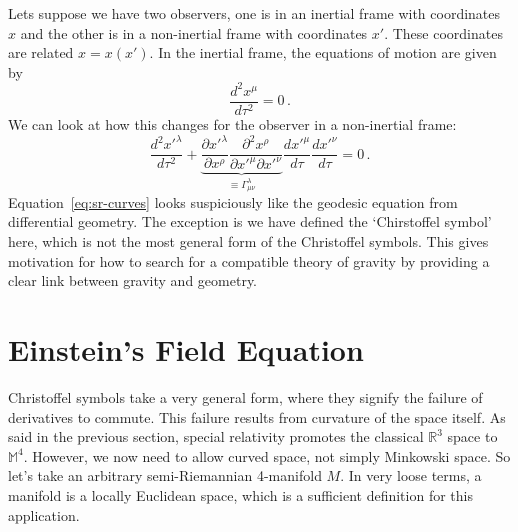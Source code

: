 Lets suppose we have two observers, one is in an inertial frame with coordinates $x$ and the other is in a non-inertial frame with coordinates $x'$. These coordinates are related $x = x(x')$. In the inertial frame, the equations of motion are given by 
\begin{equation}
    \frac{d^2x^\mu}{d\tau^2} = 0\,.
\end{equation} 
We can look at how this changes for the observer in a non-inertial frame:
\begin{equation}\label{eq:sr-curves}
    \frac{d^2x'^\lambda}{d\tau^2}+\underbrace{\frac{\partial x'^\lambda}{\partial x^\rho}\frac{\partial^2 x^\rho}{\partial x'^\mu \partial x'^\nu}}_{\equiv \Gamma_{\mu\nu}^\lambda} \frac{d x'^\mu}{d \tau} \frac{d x'^\nu}{d \tau} = 0\,.
\end{equation}
Equation~\ref{eq:sr-curves} looks suspiciously like the geodesic equation from differential geometry. The exception is we have defined the `Chirstoffel symbol' here, which is not the most general form of the Christoffel symbols. This gives motivation for how to search for a compatible theory of gravity by providing a clear link between gravity and geometry. 
\section{Einstein's Field Equation}
Christoffel symbols take a very general form, where they signify the failure of derivatives to commute. This failure results from curvature of the space itself. As said in the previous section, special relativity promotes the classical $\mathbb{R}^3$ space to $\mathbb{M}^4$. However, we now need to allow curved space, not simply Minkowski space. So let's take an arbitrary semi-Riemannian 4-manifold $M$. In very loose terms, a manifold is a locally Euclidean space, which is a sufficient definition for this application.

